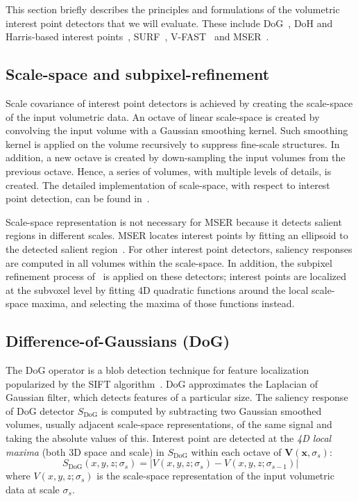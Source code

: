 This section briefly describes the principles and formulations of the volumetric interest point detectors that we will evaluate.
These include DoG~\cite{Flitton2010}, DoH and Harris-based interest points~\cite{Laptev2005}, SURF~\cite{Willems2008, Knopp2010}, V-FAST~\cite{Yu2010} and MSER~\cite{Donoser2006, Riemenschneider2009}. 

\subsection{Scale-space and subpixel-refinement}
\label{sec:subvoxel}

Scale covariance of interest point detectors is achieved by creating the scale-space of the input volumetric data. An octave of linear scale-space is created by convolving the input volume with a Gaussian smoothing kernel. Such smoothing kernel is applied on the volume recursively to suppress fine-scale structures. In addition, a new octave is created by down-sampling the input volumes from the previous octave. Hence, a series of volumes, with multiple levels of details, is created. The detailed implementation of scale-space, with respect to interest point detection, can be found in~\cite{Lindeberg1998}. 

Scale-space representation is not necessary for MSER because it detects salient regions in different scales. MSER locates interest points by fitting an ellipsoid to the detected salient region~\cite{Matas2004}. For other interest point detectors, saliency responses are computed in all volumes within the scale-space. In addition, the subpixel refinement process of~\cite{Lowe2004} is applied on these detectors; interest points are localized at the subvoxel level by fitting 4D quadratic functions around the local scale-space maxima, and selecting the maxima of those functions instead. 

\subsection{Difference-of-Gaussians (DoG)}
The DoG operator is a blob detection technique for feature localization popularized by the SIFT algorithm~\cite{Lowe2004}.    
DoG approximates the Laplacian of Gaussian filter, which detects features of a particular size. 
The saliency response of DoG detector $S_{\textrm{DoG}}$ is computed by subtracting two Gaussian smoothed volumes, usually adjacent scale-space representations, of the same signal and taking the absolute values of this.
Interest point are detected at the \emph{4D local maxima} (both 3D space and scale) in $S_{\textrm{DoG}}$ within each octave of $\mathbf{V}(\mathbf{x},\sigma_s)$:
\begin{equation}
S_{\textrm{DoG}}(x,y,z;\sigma_s) = |V(x,y,z;\sigma_s) - V(x,y,z;\sigma_{s-1})|
\end{equation}
where $V(x,y,z;\sigma_s)$ is the scale-space representation of the input volumetric data at scale $\sigma_s$.

